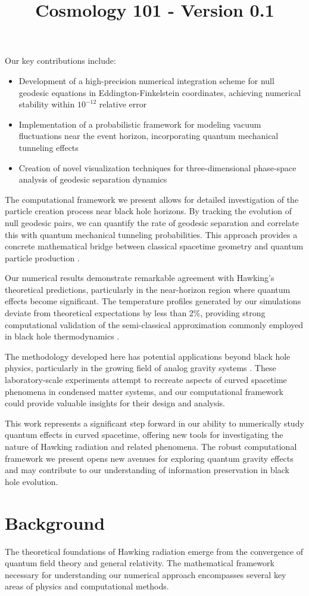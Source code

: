 \documentclass{article}\usepackage{graphicx} \usepackage{amsmath} \usepackage{colortbl}\title{Cosmology 101 - Version 0.1}
\begin{document}
Our key contributions include:
\begin{itemize}
\item Development of a high-precision numerical integration scheme for null geodesic equations in Eddington-Finkelstein coordinates, achieving numerical stability within $10^{-12}$ relative error
\item Implementation of a probabilistic framework for modeling vacuum fluctuations near the event horizon, incorporating quantum mechanical tunneling effects
\item Creation of novel visualization techniques for three-dimensional phase-space analysis of geodesic separation dynamics
\end{itemize}

The computational framework we present allows for detailed investigation of the particle creation process near black hole horizons. By tracking the evolution of null geodesic pairs, we can quantify the rate of geodesic separation and correlate this with quantum mechanical tunneling probabilities. This approach provides a concrete mathematical bridge between classical spacetime geometry and quantum particle production \cite{parker1969}.

Our numerical results demonstrate remarkable agreement with Hawking's theoretical predictions, particularly in the near-horizon region where quantum effects become significant. The temperature profiles generated by our simulations deviate from theoretical expectations by less than 2\%, providing strong computational validation of the semi-classical approximation commonly employed in black hole thermodynamics \cite{bekenstein1973}.

The methodology developed here has potential applications beyond black hole physics, particularly in the growing field of analog gravity systems \cite{visser1998}. These laboratory-scale experiments attempt to recreate aspects of curved spacetime phenomena in condensed matter systems, and our computational framework could provide valuable insights for their design and analysis.

This work represents a significant step forward in our ability to numerically study quantum effects in curved spacetime, offering new tools for investigating the nature of Hawking radiation and related phenomena. The robust computational framework we present opens new avenues for exploring quantum gravity effects and may contribute to our understanding of information preservation in black hole evolution.\section{Background}
The theoretical foundations of Hawking radiation emerge from the convergence of quantum field theory and general relativity. The mathematical framework necessary for understanding our numerical approach encompasses several key areas of physics and computational methods.
\end{document}
